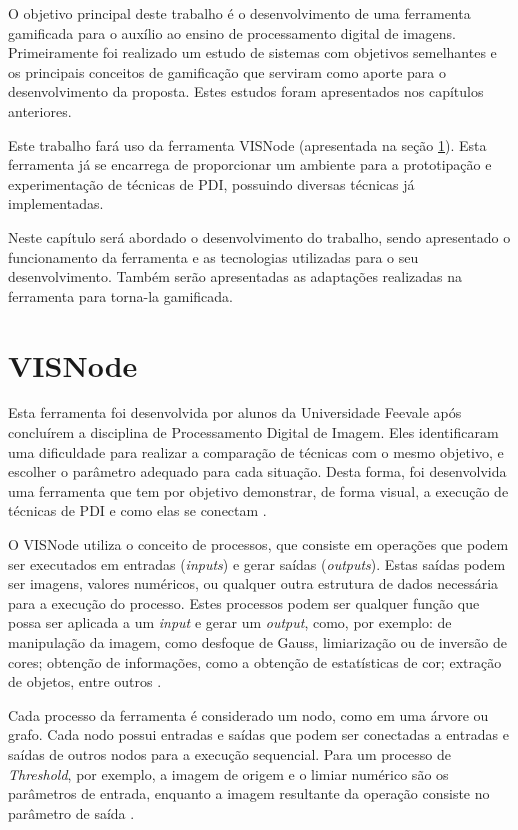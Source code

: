 \documentclass[
	12pt,				%
	oneside,			%
	a4paper,			%
	english,			%
	french,				%
	spanish,			%
	brazil,				%
	]{abntex2}
\begin{document}
O objetivo principal deste trabalho é o desenvolvimento de uma ferramenta gamificada para o auxílio ao ensino de processamento digital de imagens. Primeiramente foi realizado um estudo de sistemas com objetivos semelhantes e os principais conceitos de gamificação que serviram como aporte para o desenvolvimento da proposta. Estes estudos foram apresentados nos capítulos anteriores.
    
Este trabalho fará uso da ferramenta VISNode (apresentada na seção \ref{sec:visnode}). Esta ferramenta já se encarrega de proporcionar um ambiente para a prototipação e experimentação de técnicas de PDI, possuindo diversas técnicas já implementadas. 

Neste capítulo será abordado o desenvolvimento do trabalho, sendo apresentado o funcionamento da ferramenta e as tecnologias utilizadas para o seu desenvolvimento. Também serão apresentadas as adaptações realizadas na ferramenta para torna-la gamificada.
   
\section{VISNode}
\label{sec:visnode}

Esta ferramenta foi desenvolvida por alunos da Universidade Feevale após concluírem a disciplina de Processamento Digital de Imagem. Eles identificaram uma dificuldade para realizar a comparação de técnicas com o mesmo objetivo, e escolher o parâmetro adequado para cada situação. Desta forma, foi desenvolvida uma ferramenta que tem por objetivo demonstrar, de forma visual,  a execução de técnicas de PDI e como elas se conectam \cite{visnode}.

O VISNode utiliza o conceito de processos, que consiste em operações que podem ser executados em entradas (\textit{inputs}) e gerar saídas (\textit{outputs}). Estas saídas podem ser imagens, valores numéricos, ou qualquer outra estrutura de dados necessária para a execução do processo. Estes processos podem ser qualquer função que possa ser aplicada a um \textit{input} e gerar um \textit{output}, como, por exemplo: de manipulação da imagem, como desfoque de Gauss, limiarização ou de inversão de cores; obtenção de informações, como a obtenção de estatísticas de cor;  extração de objetos, entre outros \cite{visnode}.

Cada processo da ferramenta é considerado um nodo, como em uma árvore ou grafo. Cada nodo possui entradas e saídas que podem ser conectadas a entradas e saídas de outros nodos para a execução sequencial. Para um processo de \textit{Threshold}, por exemplo, a imagem de origem e o limiar numérico são os parâmetros de entrada, enquanto a imagem resultante da operação consiste no parâmetro de saída \cite{visnode}. 
\end{document}
